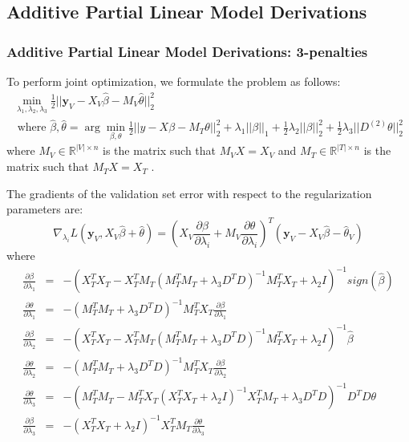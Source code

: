 \documentclass[10pt,letterpaper]{article}
\begin{document}
\subsection{Additive Partial Linear Model Derivations}

\subsubsection{Additive Partial Linear Model Derivations: 3-penalties}

To perform joint optimization, we formulate the problem as follows:
\begin{multline}
\min_{\lambda_1, \lambda_2, \lambda_3} \frac{1}{2} \bigl\lvert\bigl\lvert \boldsymbol y_V - X_V\hat\beta - M_V \hat\theta \bigl\rvert\bigl\rvert^2_2 \\
\text{ where } \hat\beta, \hat\theta = \arg\min_{\beta, \theta} \frac{1}{2} \bigl\lvert\bigl\lvert y - X\beta - M_T \theta \bigl\rvert\bigl\rvert^2_2
+ \lambda_1 \lvert\lvert \beta \rvert \rvert_1
+ \frac{1}{2} \lambda_2 \lvert\lvert \beta \rvert \rvert_2^2
+ \frac{1}{2} \lambda_3 \lvert\lvert D^{(2)} \theta \rvert \rvert_2^2
\end{multline}
where $M_V \in \mathbb{R}^{|V| \times n}$ is the matrix such that $M_V X = X_V$ and $M_T \in \mathbb{R}^{|T| \times n}$ is the matrix such that $M_T X = X_T$ .

The gradients of the validation set error with respect to the regularization parameters are:
\begin{equation}
\nabla_{\lambda_i} L(\boldsymbol y_V, X_V \hat \beta + \hat \theta) = (X_V \frac{\partial \beta}{\partial \lambda_i} + M_V \frac{\partial \theta}{\partial \lambda_i})^T(\boldsymbol y_V - X_V \hat \beta - \hat \theta_V)
\end{equation}
where
\begin{equation}
\begin{array}{lcl}
\frac{\partial \beta}{\partial \lambda_1} &=& -(X_T^T X_T - X_T^T M_T(M_T^T M_T + \lambda_3 D^TD)^{-1} M_T^T X_T + \lambda_2 I)^{-1} sign(\hat \beta) \\
\frac{\partial \theta}{\partial \lambda_1} &=& -(M_T^T M_T + \lambda_3 D^T D)^{-1}  M_T^T X_T \frac{\partial \beta}{\partial \lambda_1}
\\
\frac{\partial \beta}{\partial \lambda_2} &=& -(X_T^T X_T - X_T^T M_T(M_T^T M_T + \lambda_3 D^TD)^{-1} M_T^T X_T + \lambda_2 I)^{-1} \hat \beta \\
\frac{\partial \theta}{\partial \lambda_2} &=& -(M_T^T M_T + \lambda_3 D^T D)^{-1}  M_T^T X_T \frac{\partial \beta}{\partial \lambda_2}
\\
\frac{\partial \theta}{\partial \lambda_3} &=& -(M_T^T M_T - M_T^T X_T (X_T^TX_T + \lambda_2 I)^{-1} X_T^T M_T + \lambda_3 D^TD)^{-1} D^TD \theta
\\
\frac{\partial \beta}{\partial \lambda_3} &=& - (X_T^TX_T + \lambda_2 I)^{-1} X_T^T M_T \frac{\partial \theta}{\partial \lambda_3} \\
\end{array}
\end{equation}
\end{document}

